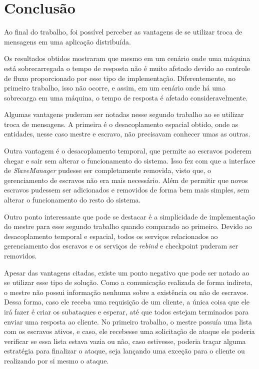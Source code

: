 \documentclass[
	12pt,				%
    oneside,			%
	a4paper,			%
	english,			%
	brazil,				%
	]{abntex2}
\begin{document}
\chapter{Conclusão}

Ao final do trabalho, foi possível perceber as vantagens de se utilizar troca de mensagens em uma aplicação distribuída. 

Os resultados obtidos mostraram que mesmo em um cenário onde uma máquina está sobrecarregada o tempo de resposta não é muito afetado devido ao controle de fluxo proporcionado por esse tipo de implementação. Diferentemente, no primeiro trabalho, isso não ocorre, e assim, em um cenário onde há uma sobrecarga em uma máquina, o tempo de resposta é afetado consideravelmente.

Algumas vantagens puderam ser notadas nesse segundo trabalho ao se utilizar troca de mensagens. A primeira é o desacoplamento espacial obtido, onde as entidades, nesse caso mestre e escravo, não precisavam conhecer umas as outras.

Outra vantagem é o desacoplamento temporal, que permite ao escravos poderem chegar e sair sem alterar o funcionamento do sistema. Isso fez com que a interface de \textit{SlaveManager} pudesse ser completamente removida, visto que, o gerenciamento de escravos não era mais necessário. Além de permitir que novos escravos pudessem ser adicionados e removidos de forma bem mais simples, sem alterar o funcionamento do resto do sistema.

Outro ponto interessante que pode se destacar é a simplicidade de implementação do mestre para esse segundo trabalho quando comparado ao primeiro. Devido ao desacoplamento temporal e espacial, todos os serviços relacionados ao gerenciamento dos escravos e os serviços de \textit{rebind} e checkpoint puderam ser removidos.

Apesar das vantagens citadas, existe um ponto negativo que pode ser notado ao se utilizar esse tipo de solução. Como a comunicação realizada de forma indireta, o mestre não possui informação nenhuma sobre a existência ou não de escravos. Dessa forma, caso ele receba uma requisição de um cliente, a única coisa que ele irá fazer é criar os subataques e esperar, até que todos estejam terminados para enviar uma resposta ao cliente. No primeiro trabalho, o mestre possuía uma lista com os escravos ativos, e caso, ele recebesse uma solicitação de ataque ele poderia verificar se essa lista estava vazia ou não, caso estivesse, poderia traçar alguma estratégia para finalizar o ataque, seja lançando uma exceção para o cliente ou realizando por si mesmo o ataque.




\postextual


\end{document}

